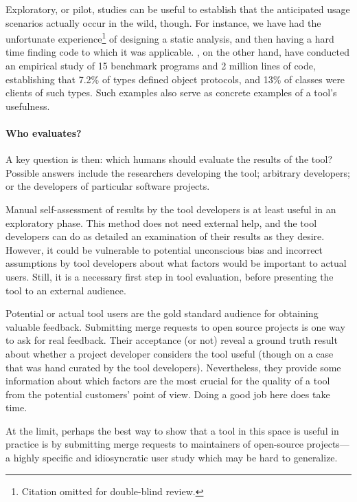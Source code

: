 Exploratory, 
or pilot, studies can be useful to establish that the
anticipated usage scenarios actually occur in the wild, though. For instance,
we have had the unfortunate experience\footnote{Citation omitted for double-blind review.} of designing a static analysis,
and then having a hard time finding code to which it was
applicable. \cite{beckman11:_empir_study_objec_protoc_wild}, on the
other hand, have conducted an empirical study of 15 benchmark programs
and 2 million lines of code, establishing that 7.2\% of types defined
object protocols, and 13\% of classes were clients of such types.
Such examples also serve as concrete examples of a tool's usefulness.


\paragraph{Who evaluates?}
A key question is then: which humans should evaluate the
results of the tool?  Possible answers include the researchers
developing the tool; arbitrary developers; or the developers of
particular software projects.

Manual self-assessment of results by the tool developers is at least
useful in an exploratory phase. This method does not need external
help, and the tool developers can do as detailed an examination of
their results as they desire. However, it could be vulnerable to
potential unconscious bias and incorrect assumptions by tool
developers about what factors would be important to actual
users. Still, it is a necessary first step in tool evaluation, before
presenting the tool to an external audience.

Potential or actual tool users are the gold standard audience for
obtaining valuable feedback. Submitting merge requests to open source
projects is one way to ask for real feedback. Their acceptance (or
not) reveal a ground truth result about whether a project developer
considers the tool useful (though on a case that was hand curated by
the tool developers). Nevertheless, they provide some information
about which factors are the most crucial for the quality of a tool
from the potential customers' point of view. Doing a good job here
does take time.

At the limit, perhaps the
best way to show that a tool in this space is useful in practice is by
submitting merge requests to maintainers of open-source projects---a 
highly specific and idiosyncratic user study which may be hard to generalize.

